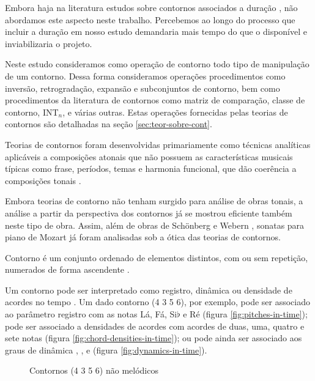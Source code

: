 Embora haja na literatura estudos sobre contornos associados a duração
\cite{beard03:contour}, não abordamos este aspecto neste
trabalho. Percebemos ao longo do processo que incluir a duração em
nosso estudo demandaria mais tempo do que o disponível e
inviabilizaria o projeto.

Neste estudo consideramos como operação de contorno todo tipo de
manipulação de um contorno. Dessa forma consideramos operações
procedimentos como inversão, retrogradação, expansão e subconjuntos de
contorno, bem como procedimentos da literatura de contornos como
matriz de comparação, classe de contorno, INT$_n$, e várias
outras. Estas operações fornecidas pelas teorias de contornos são
detalhadas na seção \ref{sec:teor-sobre-cont}.

Teorias de contornos foram desenvolvidas primariamente como técnicas
analíticas aplicáveis a composições atonais que não possuem as
características musicais típicas como frase, períodos, temas e
harmonia funcional, que dão coerência a composições tonais
\cite[p. 1]{beard03:contour}.

Embora teorias de contorno não tenham surgido para análise de obras
tonais, a análise a partir da perspectiva dos contornos já se mostrou
eficiente também neste tipo de obra. Assim, além de obras de Schönberg
\cite{friedmann85:methodology} e Webern \cite{clifford95:contour},
sonatas para piano de Mozart \cite{beard03:contour} já foram
analisadas sob a ótica das teorias de contornos.

Contorno é um conjunto ordenado de elementos distintos, com ou sem
repetição, numerados de forma ascendente
\cite[p. 206]{morris93:directions}.

Um contorno pode ser interpretado como registro, dinâmica ou densidade
de acordes no tempo \cite[p. 206]{morris93:directions}
\cite[p. 22]{clifford95:contour}. Um dado contorno (4 3 5 6), por
exemplo, pode ser associado ao parâmetro registro com as notas Lá, Fá,
Si$\flat$ e Ré (figura \ref{fig:pitches-in-time}); pode ser associado
a densidades de acordes com acordes de duas, uma, quatro e sete notas
(figura \ref{fig:chord-densities-in-time}); ou pode ainda ser
associado aos graus de dinâmica , ,  e
 (figura \ref{fig:dynamics-in-time}).

\begin{figure}
  \centering

  \caption{Contornos (4 3 5 6) não melódicos}
  \label{fig:non-melodic-contours}
\end{figure}

